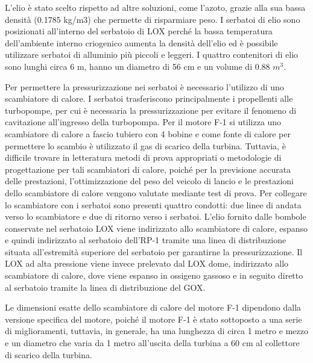L’elio è stato scelto rispetto ad altre soluzioni, come l’azoto, grazie alla sua bassa densità (0.1785 kg/m3) che permette di risparmiare peso.
I serbatoi di elio sono posizionati all’interno del serbatoio di LOX perché la bassa temperatura dell’ambiente interno criogenico aumenta la densità dell’elio ed è possibile utilizzare serbatoi di alluminio più piccoli e leggeri.
I quattro contenitori di elio sono lunghi circa 6 m, hanno un diametro di 56 cm e un volume di 0.88 $m^3$.

Per permettere la pressurizzazione nei serbatoi è necessario l’utilizzo di uno scambiatore di calore.
I serbatoi trasferiscono principalmente i propellenti alle turbopompe, per cui è necessaria la pressurizzazione per evitare il fenomeno di cavitazione all'ingresso della turbopompa. 
Per il motore F-1 si utilizza uno scambiatore di calore a fascio tubiero con 4 bobine e come fonte di calore per permettere lo scambio è utilizzato il gas di scarico della turbina.
Tuttavia, è difficile trovare in letteratura metodi di prova appropriati o metodologie di progettazione per tali scambiatori di calore, poiché per la previsione accurata delle prestazioni, l'ottimizzazione del peso del veicolo di lancio e le prestazioni dello scambiatore di calore vengono valutate mediante test di prova. 
Per collegare lo scambiatore con i serbatoi sono presenti quattro condotti: due linee di andata verso lo scambiatore e due di ritorno verso i serbatoi.
L'elio fornito dalle bombole conservate nel serbatoio LOX viene indirizzato allo scambiatore di calore, espanso e quindi indirizzato al serbatoio dell’RP-1 tramite una linea di distribuzione situata all'estremità superiore del serbatoio per garantirne la pressurizzazione. 
Il LOX ad alta pressione viene invece prelevato dal LOX dome, indirizzato allo scambiatore di calore, dove viene espanso in ossigeno gassoso e in seguito diretto al serbatoio tramite la linea di distribuzione del GOX.

Le dimensioni esatte dello scambiatore di calore del motore F-1 dipendono dalla versione specifica del motore, poiché il motore F-1 è stato sottoposto a una serie di miglioramenti, tuttavia, in generale, ha una lunghezza di circa 1 metro e mezzo e un diametro che varia da 1 metro all'uscita della turbina a 60 cm al collettore di scarico della turbina. 


